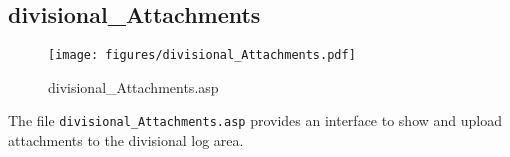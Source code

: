 \subsection{divisional\_Attachments}
\begin{figure}[htb]
    \begin{center}
        \texttt{[image: figures/divisional\_Attachments.pdf]}
    \end{center}
    \caption{divisional\_Attachments.asp}
    \label{fig:divisional_Attachments}
\end{figure}

The file \verb|divisional_Attachments.asp| provides an interface to show and
upload attachments to the divisional log area.
